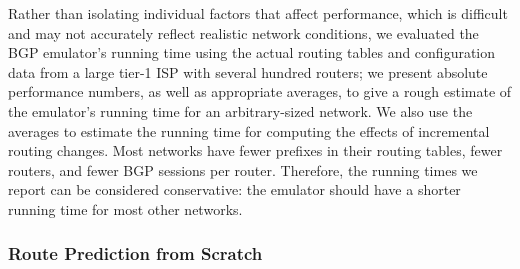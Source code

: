 Rather than isolating individual factors that affect performance, which
is difficult and may not accurately reflect realistic network
conditions, we evaluated the BGP emulator's running time using the
actual routing tables and configuration data from a large tier-1 ISP
with several hundred routers; we 
present absolute performance numbers, as well as appropriate averages, to
give a rough 
estimate of the emulator's running time for an arbitrary-sized network.
We also use the averages to estimate the running time for computing the
effects of incremental routing changes.
Most networks have fewer prefixes in their routing tables, fewer
routers, and fewer BGP sessions per router. Therefore, the running times
we report can be considered conservative: the emulator should have a
shorter running time for most other networks.  



\subsubsection{Route Prediction from Scratch}
\label{sec:scratch}

